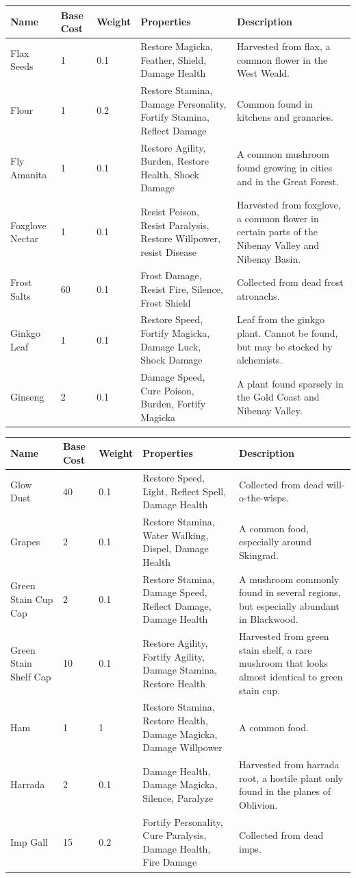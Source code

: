 \documentclass[12pt]{book}
\begin{document}
\begin{tabular}{|p{}|p{}|p{}|p{}|p{}|}
\hline
Name & Base Cost & Weight & Properties & Description\\ \hline
Flax Seeds & 1 & 0.1 & Restore Magicka, Feather, Shield, Damage Health & Harvested from flax, a common flower in the West Weald.\\ \hline
Flour & 1 & 0.2 & Restore Stamina, Damage Personality, Fortify Stamina, Reflect Damage & Common found in kitchens and granaries.\\ \hline
Fly Amanita & 1 & 0.1 & Restore Agility, Burden, Restore Health, Shock Damage & A common mushroom found growing in cities and in the Great Forest.\\ \hline
Foxglove Nectar & 1 & 0.1 & Resist Poison, Resist Paralysis, Restore Willpower, resist Disease & Harvested from foxglove, a common flower in certain parts of the Nibenay Valley and Nibenay Basin.\\ \hline
Frost Salts & 60 & 0.1 & Frost Damage, Resist Fire, Silence, Frost Shield & Collected from dead frost atronachs.\\ \hline
Ginkgo Leaf & 1 & 0.1 & Restore Speed, Fortify Magicka, Damage Luck, Shock Damage & Leaf from the ginkgo plant. Cannot be found, but may be stocked by alchemists.\\ \hline
Ginseng & 2 & 0.1 & Damage Speed, Cure Poison, Burden, Fortify Magicka & A plant found sparsely in the Gold Coast and Nibenay Valley.\\ \hline
\end{tabular}

\begin{tabular}{|p{}|p{}|p{}|p{}|p{}|}
\hline
Name & Base Cost & Weight & Properties & Description\\ \hline
Glow Dust & 40 & 0.1 & Restore Speed, Light, Reflect Spell, Damage Health & Collected from dead will-o-the-wisps.\\ \hline
Grapes & 2 & 0.1 & Restore Stamina, Water Walking, Dispel, Damage Health & A common food, especially around Skingrad.\\ \hline
Green Stain Cup Cap & 2 & 0.1 & Restore Stamina, Damage Speed, Reflect Damage, Damage Health & A mushroom commonly found in several regions, but especially abundant in Blackwood.\\ \hline
Green Stain Shelf Cap & 10 & 0.1 & Restore Agility, Fortify Agility, Damage Stamina, Restore Health & Harvested from green stain shelf, a rare mushroom that looks almost identical to green stain cup.\\ \hline
Ham & 1 & 1 & Restore Stamina, Restore Health, Damage Magicka, Damage Willpower & A common food.\\ \hline
Harrada & 2 & 0.1 & Damage Health, Damage Magicka, Silence, Paralyze & Harvested from harrada root, a hostile plant only found in the planes of Oblivion.\\ \hline
Imp Gall & 15 & 0.2 & Fortify Personality, Cure Paralysis, Damage Health, Fire Damage & Collected from dead imps.\\ \hline
\end{tabular}
\end{document}
